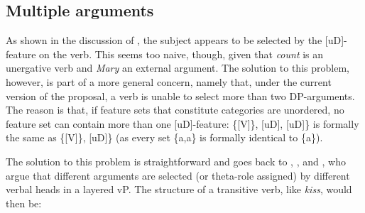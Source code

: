 \documentclass[output=paper
,modfonts
,nonflat]{langsci/langscibook}
\begin{document}
\subsection{Multiple arguments} \label{sec-zeijlstra:3.5}
As shown in the discussion of , the subject appears to be selected by the [uD]-feature on the verb. This seems too naive, though, given that \textit{count} is an unergative verb and \textit{Mary} an external argument. The solution to this problem, however, is part of a more general concern, namely that, under the current version of the proposal, a verb is unable to select more than two DP-arguments. The reason is that, if feature sets that constitute categories are unordered, no feature set can contain more than one [uD]-feature: \{[V]\}, [uD], [uD]\} is formally the same as \{[V]\}, [uD]\} (as every set \{a,a\} is formally identical to \{a\}).

The solution to this problem is straightforward and goes back to \citet{Larson1988},  \citet{Hale_Keyser1993}, and \citet{Kratzer1996}, who argue that different arguments are selected (or theta-role assigned) by different verbal heads in a layered vP. The structure of a transitive verb, like \textit{kiss}, would then be: 
\end{document}
